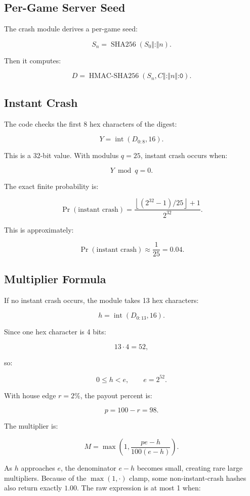 \documentclass[11pt]{article}
\begin{document}
\subsection{Per-Game Server Seed}

The crash module derives a per-game seed:

\[
S_n = \operatorname{SHA256}(S_0 \Vert \texttt{:} \Vert n).
\]

Then it computes:

\[
D = \operatorname{HMAC\text{-}SHA256}(S_n, C \Vert \texttt{:} \Vert n \Vert \texttt{:0}).
\]

\subsection{Instant Crash}

The code checks the first 8 hex characters of the digest:

\[
Y = \operatorname{int}(D_{0:8},16).
\]

This is a 32-bit value. With modulus \(q=25\), instant crash occurs when:

\[
Y \bmod q = 0.
\]

The exact finite probability is:

\[
\Pr(\text{instant crash})
=
\frac{\left\lfloor (2^{32}-1)/25 \right\rfloor + 1}{2^{32}}.
\]

This is approximately:

\[
\Pr(\text{instant crash}) \approx \frac{1}{25} = 0.04.
\]

\subsection{Multiplier Formula}

If no instant crash occurs, the module takes 13 hex characters:

\[
h = \operatorname{int}(D_{0:13},16).
\]

Since one hex character is 4 bits:

\[
13 \cdot 4 = 52,
\]

so:

\[
0 \leq h < e, \qquad e = 2^{52}.
\]

With house edge \(r=2\%\), the payout percent is:

\[
p = 100-r = 98.
\]

The multiplier is:

\[
M = \max\left(1,\frac{pe-h}{100(e-h)}\right).
\]

As \(h\) approaches \(e\), the denominator \(e-h\) becomes small, creating rare large multipliers. Because of the \(\max(1,\cdot)\) clamp, some non-instant-crash hashes also return exactly \(1.00\). The raw expression is at most 1 when:
\end{document}

